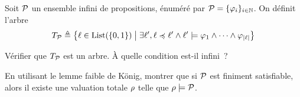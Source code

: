 \begin{problem}
  \noindent
  Soit $\mathcal P$ un ensemble infini de propositions, énuméré par
  $\mathcal P = \{\varphi_i\}_{i \in \mathbb N}$. On définit l'arbre
  \[T_{\mathcal P} \triangleq \left\{ \ell \in \operatorname{List}(\{0,1\}) \;\middle\vert\; 
    \exists \ell', \ell \preccurlyeq \ell' \land
    \ell' \models \varphi_1 \land \cdots \land \varphi_{\left\vert\ell\right\vert}  \right\}\]
  \begin{pbQuest}[resume]
  \item Vérifier que $T_{\mathcal P}$ est un arbre. \`A quelle condition
    est-il infini~?
  \item En utilisant le lemme faible de König, montrer
    que si $\mathcal P$ est finiment satisfiable, alors il existe une valuation
    totale $\rho$ telle que $\rho \models \mathcal P$.
  \end{pbQuest}
\end{problem}

\clearpage

